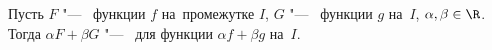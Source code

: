 
  Пусть $F$ "--- \tp\ функции $f$ на~промежутке $I$, $G$ "--- \tp\ функции $g$ на~$I$, $\alpha,\beta\in\R$. Тогда
  $\alpha F+\beta G$ "--- \tp\ для функции $\alpha f+\beta g$ на~$I$.
